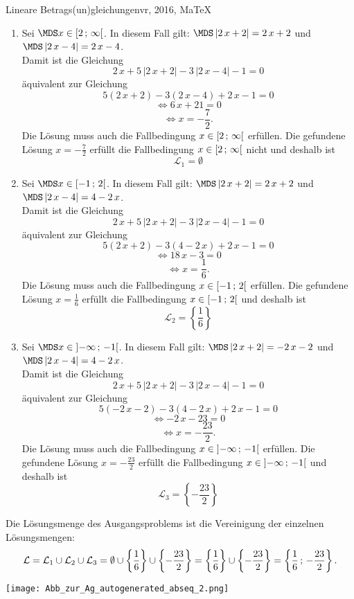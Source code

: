 \begin{MAufgabe}{Lineare Betrags(un)gleichungen}{vr, 2016, MaTeX}
 \begin{enumerate} 
 \item Sei $ \MDS x\in[ 2 \, \MIntvlSep \, \infty\MoIr $. 
 In diesem Fall gilt: 
  $ \MDS \left| 2\, x + 2\right|=2\, x + 2$ und $ \MDS \left| 2\, x - 4\right|=2\, x - 4$. \\ 
 Damit ist die Gleichung 
 $$ 
2\, x + 5\, \left|2\, x + 2\right| - 3\, \left|2\, x - 4\right| - 1= 0
$$
 \"aquivalent zur Gleichung
 $$ 
5\left(2\, x + 2\right)-3\left( 2\, x - 4\right)+2\, x-1= 0 
$$  
$$ 
 \Leftrightarrow 6\, x + 21= 0 
$$  
$$ \Leftrightarrow x = - \frac{7}{2} . 
 $$ 
 Die L\"osung muss auch die Fallbedingung $x\in [ 2 \, ; \, \infty[\mbox{}  $ erf\"ullen. Die gefundene L\"osung $x=- \frac{7}{2}$ erf\"ullt die Fallbedingung  $x\in [ 2 \, ; \, \infty[\mbox{} $ nicht und deshalb ist  $$
 \mathcal{L}_{1}=\emptyset 
 $$ 
\item Sei $ \MDS x\in[ -1 \, \MIntvlSep \, 2\MoIr $. 
 In diesem Fall gilt: 
  $ \MDS \left| 2\, x + 2\right|=2\, x + 2$ und $ \MDS \left| 2\, x - 4\right|=4 - 2\, x$. \\ 
 Damit ist die Gleichung 
 $$ 
2\, x + 5\, \left|2\, x + 2\right| - 3\, \left|2\, x - 4\right| - 1= 0
$$
 \"aquivalent zur Gleichung
 $$ 
5\left(2\, x + 2\right)-3\left( 4 - 2\, x\right)+2\, x-1= 0 
$$  
$$ 
 \Leftrightarrow 18\, x - 3= 0 
$$  
$$ \Leftrightarrow x = \frac{1}{6} . 
 $$ 
 Die L\"osung muss auch die Fallbedingung $x\in [ -1 \, ; \, 2[\mbox{}  $ erf\"ullen. Die gefundene L\"osung $x=\frac{1}{6}$ erf\"ullt die Fallbedingung  $x\in [ -1 \, ; \, 2[\mbox{} $ und deshalb ist  $$
 \mathcal{L}_{2}=\left\{\frac{1}{6}\right\}
 $$ 
\item Sei $ \MDS x\in\MoIl  -\infty \, \MIntvlSep \, -1\MoIr $. 
 In diesem Fall gilt: 
  $ \MDS \left| 2\, x + 2\right|= - 2\, x - 2$ und $ \MDS \left| 2\, x - 4\right|=4 - 2\, x$. \\ 
 Damit ist die Gleichung 
 $$ 
2\, x + 5\, \left|2\, x + 2\right| - 3\, \left|2\, x - 4\right| - 1= 0
$$
 \"aquivalent zur Gleichung
 $$ 
5\left( - 2\, x - 2\right)-3\left( 4 - 2\, x\right)+2\, x-1= 0 
$$  
$$ 
 \Leftrightarrow  - 2\, x - 23= 0 
$$  
$$ \Leftrightarrow x = - \frac{23}{2} . 
 $$ 
 Die L\"osung muss auch die Fallbedingung $x\in \mbox{}]\mathopen{}  -\infty \, ; \, -1[\mbox{}  $ erf\"ullen. Die gefundene L\"osung $x=- \frac{23}{2}$ erf\"ullt die Fallbedingung  $x\in \mbox{}]\mathopen{}  -\infty \, ; \, -1[\mbox{} $ und deshalb ist  $$
 \mathcal{L}_{3}=\left\{- \frac{23}{2}\right\}
 $$ 
 \end{enumerate} 
  Die L\"osungsmenge des Ausgangsproblems ist die Vereinigung der einzelnen L\"osungsmengen: 
$$ \mathcal{L} = \mathcal{L}_{1} \cup \mathcal{L}_{2} \cup \mathcal{L}_{3} 
 = \emptyset\cup \left\{\frac{1}{6}\right\}\cup \left\{- \frac{23}{2}\right\} 
  =\left\{\frac{1}{6}\right\}\cup\left\{- \frac{23}{2}\right\} 
  = \left\{\frac{1}{6}\, ; \,- \frac{23}{2}\right\} 
 . $$ 
 
 \begin{center}
 \texttt{[image: Abb\_zur\_Ag\_autogenerated\_abseq\_2.png]} \end{center}
 
\else\relax\fi
 \end{MAufgabe}